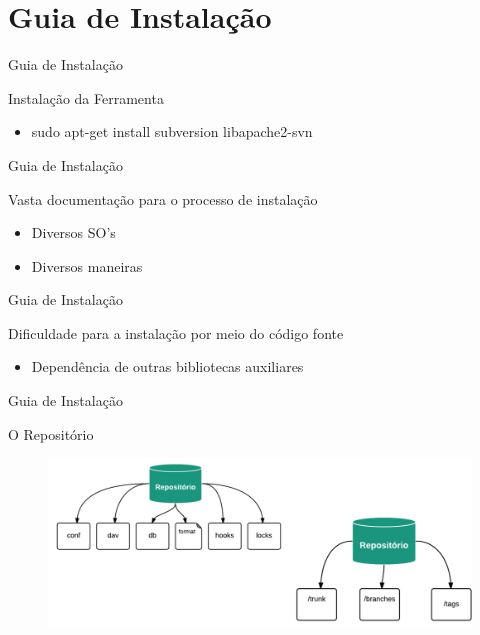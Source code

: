 \section{Guia de Instalação}

\begin{frame}{Guia de Instalação}{}
\begin{block}{Instalação da Ferramenta}
  \begin{itemize}
    \item<1-> sudo apt-get install subversion libapache2-svn
  \end{itemize}
\end{block}
\end{frame}

\begin{frame}{Guia de Instalação}
\begin{block}{Vasta documentação para o processo de instalação}
  \begin{itemize}
    \item<1-> Diversos SO's
    \item<1-> Diversos maneiras
  \end{itemize}
\end{block}
\end{frame}

\begin{frame}{Guia de Instalação}
\begin{block}{Dificuldade para a instalação por meio do código fonte}
  \begin{itemize}
    \item<1-> Dependência de outras bibliotecas auxiliares
  \end{itemize}
\end{block}
\end{frame}

\begin{frame}{Guia de Instalação}
\begin{block}{O Repositório}
  \begin{figure}[h!]
    \centering
      \includegraphics[width=1\textwidth]{figuras/repo}
  \end{figure}
\end{block}
\end{frame}

